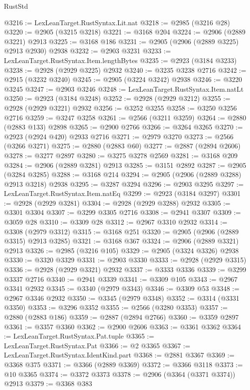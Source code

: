 \begin{lexlean}{RustStd}
\begin{coremodule}
@3216 := LexLeanTarget.RustSyntax.Lit.nat
@3218 := @2985 (@3216 @28)
@3220 := @2905 (@3215 @3218)
@3221 := @3168 @204
@3224 := @2906 (@2889 @3221) @2913
@3225 := @3168 @186
@3231 := @2905 (@2906 (@2889 @3225) @2913 @2930) @2938
@3232 := @2903 @3231
@3233 := LexLeanTarget.RustSyntax.Item.lengthBytes
@3235 := @2923 (@3184 @3233)
@3238 := @2928 (@2929 @3225) @2932
@3240 := @3235 @3238 @2716
@3242 := @2915 (@3232 @3240)
@3245 := @2905 (@3224 @3242) @2938
@3246 := @3220 @3245
@3247 := @2903 @3246
@3248 := LexLeanTarget.RustSyntax.Item.natLt
@3250 := @2923 (@3184 @3248)
@3252 := @2928 (@2929 @3212)
@3255 := @2928 (@2929 @3221) @2932
@3256 := @3252 @3255
@3258 := @3250 @3256 @2716
@3259 := @3247 @3258
@3261 := @2566 (@3211 @3259)
@3264 := @2880 (@2883 @133) @2898
@3265 := @2900 @2766
@3266 := @3264 @3265
@3270 := @2923 (@2924 @420) @2933 @2716
@3271 := @2979 @3270
@3273 := @2566 (@3266 @3271)
@3275 := @2880 (@2883 @60)
@3277 := @2887 (@2894 @2606)
@3278 := @3277 @2897
@3280 := @3275 @3278 @2569
@3281 := @3168 @209
@3284 := @2906 (@2889 @3281) @2913
@3285 := @3151 @2892
@3287 := @2905 (@3284 @3285)
@3288 := @3168 @214
@3294 := @2905 (@2906 (@2889 @3288) @2913 @3218) @2938
@3295 := @3287 @3294
@3296 := @2903 @3295
@3297 := LexLeanTarget.RustSyntax.Item.natEq
@3299 := @2923 (@3184 @3297)
@3301 := @2928 (@2929 @3281)
@3304 := @2928 (@2929 @3288) @2932
@3305 := @3301 @3304
@3307 := @3299 @3305 @2716
@3308 := @2941 @3307
@3309 := @3059 @28
@3310 := @3309 @28
@3312 := @2967 @3310 @2932
@3314 := @3308 (@2979 @3312)
@3315 := @3168 @251
@3320 := @2905 (@2906 (@2889 @3315) @2913 @3285)
@3321 := @3168 @367
@3324 := @2906 (@2889 @3321) @2913
@3326 := @2985 (@3216 @105)
@3329 := @2905 (@3324 @3326) @2938
@3330 := @3320 @3329
@3331 := @2903 @3330
@3333 := @2928 (@2929 @3315)
@3336 := @2928 (@2929 @3321) @2932
@3337 := @3333 @3336
@3339 := @3299 @3337 @2716
@3340 := @2941 @3339
@3341 := @3309 @105
@3343 := @2967 @3341 @2932
@3345 := @3340 (@2979 @3343)
@3346 := @3309 @53
@3348 := @2967 @3346 @2932
@3350 := @3345 (@2979 @3348)
@3352 := @3314 (@3331 @3350)
@3353 := @3296 @3352
@3355 := @2566 (@3280 @3353)
@3357 := @2880 (@2883 @186)
@3359 := @2887 (@2894 @2766)
@3360 := @3359 @2897
@3361 := @3357 @3360
@3362 := @2900 @2606
@3363 := @3361 @3362
@3364 := LexLeanTarget.RustSyntax.Pat.tuple
@3365 := LexLeanTarget.RustSyntax.Pat
@3366 := @2 @3365
@3367 := LexLeanTarget.RustSyntax.IdentKind.part
@3368 := @2881 @3367
@3369 := @3368 @375
@3371 := @3366 (@2889 @3369)
@3372 := @3366 @3118
@3373 := @10 @3365
@3374 := @3372 @3373
@3378 := @2906 (@3364 (@3371 @3374)) @2913
@3379 := @3368 @383

\end{coremodule}
\end{lexlean}
